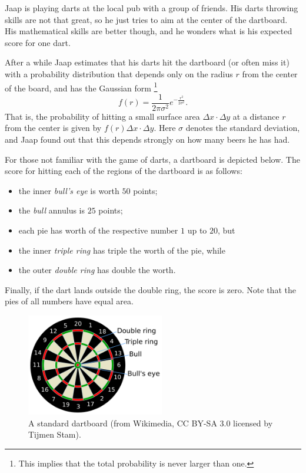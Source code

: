
Jaap is playing darts at the local pub with a group of friends. His
darts throwing skills are not that great, so he just tries to aim at
the center of the dartboard. His mathematical skills are better
though, and he wonders what is his expected score for one dart.

After a while Jaap estimates that his darts hit the dartboard (or
often miss it) with a probability distribution that depends only on
the radius $r$ from the center of the board, and has the Gaussian form%
\footnote{This implies that the total probability is never larger than one.}
\[
  f(r) = \frac{1}{2\pi\sigma^2} e^{-\frac{r^2}{2\sigma^2}}.
\]
That is, the probability of hitting a small surface area
$\Delta x\!\cdot\!\Delta y$ at a distance $r$ from the center is given
by $f(r) \Delta x\!\cdot\!\Delta y$. Here $\sigma$ denotes the
standard deviation, and Jaap found out that this depends strongly on
how many beers he has had.

For those not familiar with the game of darts, a dartboard is depicted
below. The score for hitting each of the regions of the dartboard is
as follows:
\begin{itemize}\setlength{\itemsep}{0pt}
\item the inner \emph{bull's eye} is worth $50$ points;
\item the \emph{bull} annulus is $25$ points;
\item each pie has worth of the respective number $1$ up to $20$, but
\item the inner \emph{triple ring} has triple the worth of the pie, while
\item the outer \emph{double ring} has double the worth.
\end{itemize}
Finally, if the dart lands outside the double ring, the score is zero.
Note that the pies of all numbers have equal area.

\begin{figure}[h]
  \centering
  \includegraphics[width=6cm]{dartboard}
  \caption{A standard dartboard (from Wikimedia, CC BY-SA 3.0 licensed by Tijmen Stam).}
  \label{fig:dartboard}
\end{figure}


